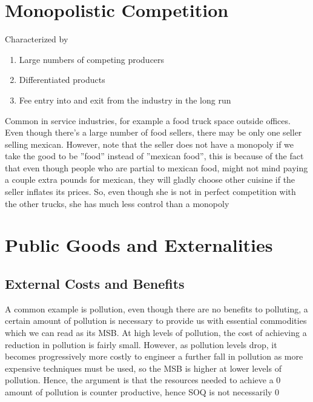 \documentclass[english,course,draft]{Notes}
\begin{document}
\section{Monopolistic Competition}
\par{Characterized by}

\begin{enumerate}
	\item Large numbers of competing producers
	\item Differentiated products
	\item Fee entry into and exit from the industry in the long run
\end{enumerate}

\par{Common in service industries, for example a food truck space outside offices. Even though there's a large number of food sellers, there may be only one seller selling mexican. However, note that the seller does not have a monopoly if we take the good to be ''food'' instead of ''mexican food'', this is because of the fact that even though people who are partial to mexican food, might not mind paying a couple extra pounds for mexican, they will gladly choose other cuisine if  the seller inflates its prices. So, even though she is not in perfect competition with the other trucks, she has much less control than a monopoly }


\section{Public Goods and Externalities} 

\subsection{External Costs and Benefits}




\par{A common example is pollution, even though there are no benefits to polluting, a certain amount of pollution is necessary to provide us with essential commodities which we can read as its MSB. At high levels of pollution, the cost of achieving a reduction in pollution is fairly small. However, as pollution levels drop, it becomes progressively more costly
to engineer a further fall in pollution as more expensive techniques must be used, so the MSB is higher at lower levels of pollution. Hence, the argument is that the resources needed to achieve a $0$ amount of pollution is counter productive, hence SOQ is not necessarily 0}
\end{document}
